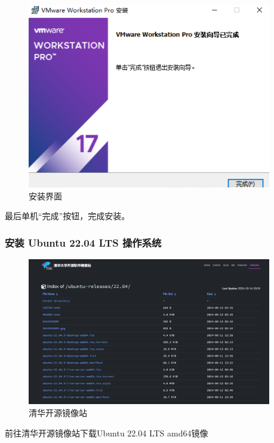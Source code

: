 \documentclass[UTF8]{ctexart}
\begin{document}
\begin{figure}[H]
    \centering
    \includegraphics[width=0.95\textwidth]{picture/Screenshot 2024-10-14 110442.png}
    \caption{安装界面}
\end{figure}
最后单机“完成”按钮，完成安装。

\subsubsection{安装 Ubuntu 22.04 LTS 操作系统}
\begin{figure}[H]
    \centering
    \includegraphics[width=0.95\textwidth]{picture/Screenshot 2024-10-14 111819.png}
    \caption{清华开源镜像站}
\end{figure}
前往清华开源镜像站下载Ubuntu 22.04 LTS amd64镜像
\end{document}

